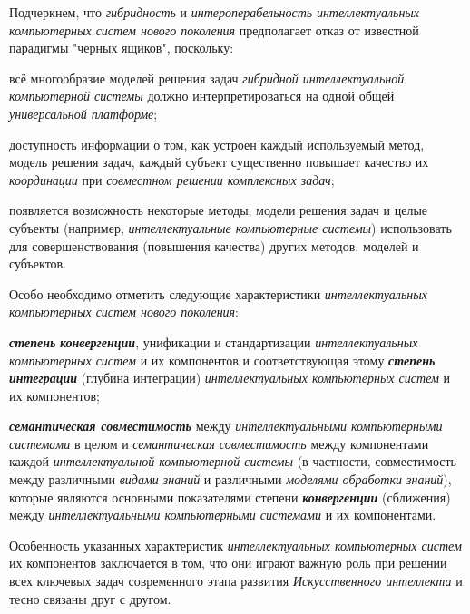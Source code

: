 Подчеркнем, что \textit{гибридность} и \textit{интероперабельность} \textit{интеллектуальных компьютерных систем нового поколения} предполагает отказ от известной парадигмы "черных ящиков"{}, поскольку:

\begin{textitemize}
	\item
	всё многообразие моделей решения задач \textit{гибридной интеллектуальной компьютерной системы} должно интерпретироваться на одной общей \textit{универсальной платформе};
	\item
	доступность информации о том, как устроен каждый используемый метод, модель решения задач, каждый субъект существенно повышает качество их \textit{координации} при \textit{совместном решении комплексных задач};
	\item
	появляется возможность некоторые методы, модели решения задач и целые субъекты (например, \textit{интеллектуальные компьютерные системы}) использовать для совершенствования (повышения качества) других методов, моделей и субъектов.
\end{textitemize}

Особо необходимо отметить следующие характеристики \textit{интеллектуальных компьютерных систем нового поколения}:
\begin{textitemize}
	\item \textbf{\textit{степень}} \textbf{\textit{конвергенции}}, унификации и стандартизации \textit{интеллектуальных компьютерных систем} и их компонентов и соответствующая этому \textbf{\textit{степень интеграции}} (глубина интеграции) \textit{интеллектуальных компьютерных систем} и их компонентов;
	\item \textbf{\textit{семантическая совместимость}} между \textit{интеллектуальными компьютерными системами} в целом и \textit{семантическая совместимость} между компонентами каждой \textit{интеллектуальной компьютерной системы} (в частности, совместимость между различными \textit{видами знаний} и различными \textit{моделями обработки знаний}), которые являются основными показателями степени \textbf{\textit{конвергенции}} (сближения) между \textit{интеллектуальными компьютерными системами} и их компонентами.
\end{textitemize}

Особенность указанных характеристик \textit{интеллектуальных компьютерных систем} их компонентов заключается в том, что они играют важную роль при решении всех ключевых задач современного этапа развития \textit{Искусственного интеллекта} и тесно связаны друг с другом.

